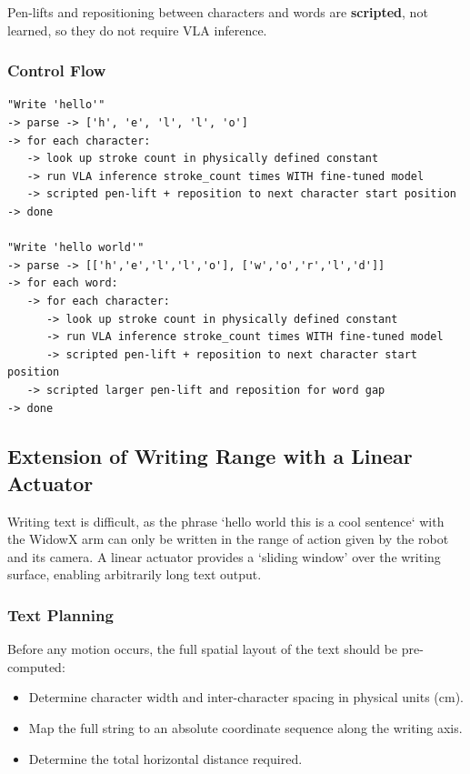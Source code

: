 \documentclass[12pt,a4paper]{article}
\begin{document}
Pen-lifts and repositioning between characters and words are \textbf{scripted}, not learned, so they do not require VLA inference.

\subsubsection*{Control Flow}

\begin{verbatim}
"Write 'hello'"
-> parse -> ['h', 'e', 'l', 'l', 'o']
-> for each character:
   -> look up stroke count in physically defined constant
   -> run VLA inference stroke_count times WITH fine-tuned model
   -> scripted pen-lift + reposition to next character start position
-> done

"Write 'hello world'"
-> parse -> [['h','e','l','l','o'], ['w','o','r','l','d']]
-> for each word:
   -> for each character:
      -> look up stroke count in physically defined constant
      -> run VLA inference stroke_count times WITH fine-tuned model
      -> scripted pen-lift + reposition to next character start position
   -> scripted larger pen-lift and reposition for word gap
-> done
\end{verbatim}

\subsection{Extension of Writing Range with a Linear Actuator}

Writing text is difficult, as the phrase `hello world this is a cool sentence` with the WidowX arm can only be written in the range of action given by the robot and its camera. A linear actuator provides a `sliding window' over the writing surface, enabling arbitrarily long text output.

\subsubsection*{Text Planning}

Before any motion occurs, the full spatial layout of the text should be pre-computed:
\begin{itemize}
  \item Determine character width and inter-character spacing in physical units (cm).
  \item Map the full string to an absolute coordinate sequence along the writing axis.
  \item Determine the total horizontal distance required.
\end{itemize}
\end{document}
